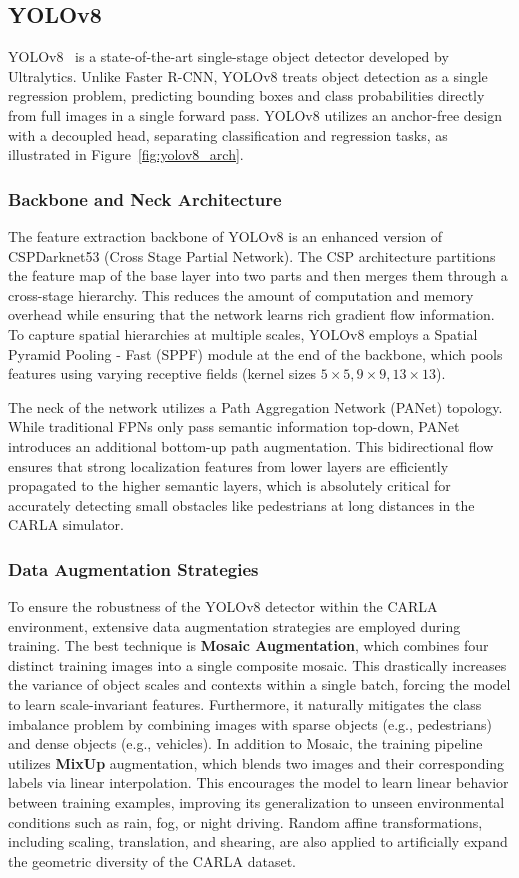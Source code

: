 \documentclass[11pt,a4paper]{report}
\begin{document}
\subsection{YOLOv8}
YOLOv8~\cite{yolov8} is a state-of-the-art single-stage object detector developed by Ultralytics. Unlike Faster R-CNN, YOLOv8 treats object detection as a single regression problem, predicting bounding boxes and class probabilities directly from full images in a single forward pass. YOLOv8 utilizes an anchor-free design with a decoupled head, separating classification and regression tasks, as illustrated in Figure~\ref{fig:yolov8_arch}.

\subsubsection{Backbone and Neck Architecture}
The feature extraction backbone of YOLOv8 is an enhanced version of CSPDarknet53 (Cross Stage Partial Network). The CSP architecture partitions the feature map of the base layer into two parts and then merges them through a cross-stage hierarchy. This reduces the amount of computation and memory overhead while ensuring that the network learns rich gradient flow information. To capture spatial hierarchies at multiple scales, YOLOv8 employs a Spatial Pyramid Pooling - Fast (SPPF) module at the end of the backbone, which pools features using varying receptive fields (kernel sizes $5 \times 5, 9 \times 9, 13 \times 13$). 

The neck of the network utilizes a Path Aggregation Network (PANet) topology. While traditional FPNs only pass semantic information top-down, PANet introduces an additional bottom-up path augmentation. This bidirectional flow ensures that strong localization features from lower layers are efficiently propagated to the higher semantic layers, which is absolutely critical for accurately detecting small obstacles like pedestrians at long distances in the CARLA simulator.

\subsubsection{Data Augmentation Strategies}
To ensure the robustness of the YOLOv8 detector within the CARLA environment, extensive data augmentation strategies are employed during training. The best technique is \textbf{Mosaic Augmentation}, which combines four distinct training images into a single composite mosaic. This drastically increases the variance of object scales and contexts within a single batch, forcing the model to learn scale-invariant features. Furthermore, it naturally mitigates the class imbalance problem by combining images with sparse objects (e.g., pedestrians) and dense objects (e.g., vehicles). In addition to Mosaic, the training pipeline utilizes \textbf{MixUp} augmentation, which blends two images and their corresponding labels via linear interpolation. This encourages the model to learn linear behavior between training examples, improving its generalization to unseen environmental conditions such as rain, fog, or night driving. Random affine transformations, including scaling, translation, and shearing, are also applied to artificially expand the geometric diversity of the CARLA dataset.
\end{document}
